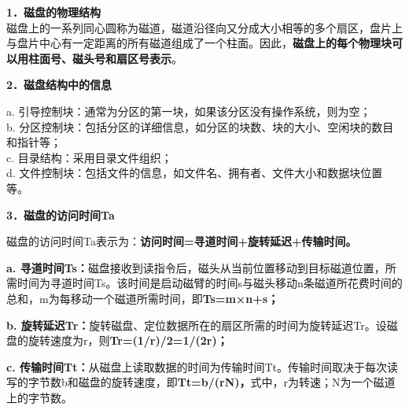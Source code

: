 \textbf{{1．磁盘的物理结构}}\\

磁盘上的一系列同心圆称为磁道，磁道沿径向又分成大小相等的多个扇区，盘片上与盘片中心有一定距离的所有磁道组成了一个柱面。因此，\textbf{磁盘上的每个物理块可以用柱面号、磁头号和扇区号表示}。

\textbf{{2．磁盘结构中的信息}}

a. 引导控制块：通常为分区的第一块，如果该分区没有操作系统，则为空；\\
b.
分区控制块：包括分区的详细信息，如分区的块数、块的大小、空闲块的数目和指针等；\\
c. 目录结构：采用目录文件组织；\\
d.
文件控制块：包括文件的信息，如文件名、拥有者、文件大小和数据块位置等。

\textbf{{3．磁盘的访问时间Ta}}

磁盘的访问时间Ta表示为：\textbf{访问时间=寻道时间+旋转延迟+传输时间。}

\textbf{a.
寻道时间Ts：}磁盘接收到读指令后，磁头从当前位置移动到目标磁道位置，所需时间为寻道时间Ts。该时间是启动磁臂的时间s与磁头移动n条磁道所花费时间的总和，m为每移动一个磁道所需时间，即\textbf{{Ts=m×n+s}；}

\textbf{b.
旋转延迟Tr：}旋转磁盘、定位数据所在的扇区所需的时间为旋转延迟Tr。设磁盘的旋转速度为r，则\textbf{{Tr=(1/r)/2=1/(2r)}；}

\textbf{c.
传输时间Tt：}从磁盘上读取数据的时间为传输时间Tt。传输时间取决于每次读写的字节数b和磁盘的旋转速度，即\textbf{{Tt=b/(rN)}，}式中，r为转速；N为一个磁道上的字节数。
